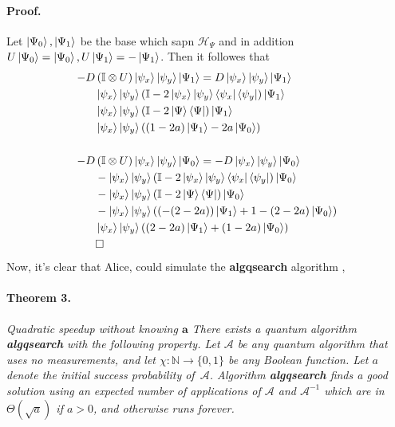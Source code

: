\documentclass{article}
\begin{document}
\begin{multicols*}{2}
\paragraph{Proof.} Let $\ket{\Psi_0}, \ket{\Psi_1}$ be the base which sapn $ \mathcal{H}_{\Psi}$ and in addition $U\ket{\Psi_0} = \ket{\Psi_0}, U\ket{\Psi_1} =- \ket{\Psi_1}$.
    Then it followes that   
    \begin{equation*}
      \begin{split}
    - D & \left( \mathbb{I} \otimes U \right)  \ket{\psi_{x}}\ket{\psi_{y}} \ket{\Psi_1} =    D  \ket{\psi_{x}}\ket{\psi_{y}} \ket{\Psi_1} \\
  &  \ket{\psi_{x}}\ket{\psi_{y}} \left( \mathbb{I} - 2 \ket{\psi_{x}}\ket{\psi_{y}} \bra{ \psi_{x}}\bra{\psi_{y}} \right) \ket{\Psi_1} \\
  &  \ket{\psi_{x}}\ket{\psi_{y}} \left( \mathbb{I} - 2 \ket{\Psi} \bra{\Psi} \right) \ket{\Psi_1}  \\ 
  &  \ket{\psi_{x}}\ket{\psi_{y}} \left( \left( 1 - 2a  \right)\ket{\Psi_1} - 2a \ket{\Psi_0} \right) \\ 
  & \\ 
  - D & \left( \mathbb{I} \otimes U \right)  \ket{\psi_{x}}\ket{\psi_{y}} \ket{\Psi_0} =   - D  \ket{\psi_{x}}\ket{\psi_{y}} \ket{\Psi_0} \\
  &  - \ket{\psi_{x}}\ket{\psi_{y}} \left( \mathbb{I} - 2 \ket{\psi_{x}}\ket{\psi_{y}} \bra{ \psi_{x}}\bra{\psi_{y}} \right) \ket{\Psi_0} \\
  &  - \ket{\psi_{x}}\ket{\psi_{y}} \left( \mathbb{I} - 2 \ket{\Psi} \bra{\Psi} \right) \ket{\Psi_0} \\ 
  &  - \ket{\psi_{x}}\ket{\psi_{y}} \left( \left(  - (2-2a)  \right)\ket{\Psi_1} + 1 -(2 - 2a) \ket{\Psi_0} \right) \\ 
  & \ket{\psi_{x}}\ket{\psi_{y}} \left( \left( 2-2a \right)\ket{\Psi_1} + \left(1  - 2a\right) \ket{\Psi_0} \right) \\ 
  & \square
\end{split}
\end{equation*}
Now, it's clear that Alice, could simulate the \textbf{algqsearch} algorithm \cite{Brassard_2002}, 

\paragraph{Theorem 3.} \textit{Quadratic speedup without knowing $\mathbf{a}$
There exists a quantum algorithm \textbf{algqsearch} with the following property.
Let $\mathcal A$ be any quantum algorithm that uses no measurements,
and let $\chi : \mathbb{N}  \rightarrow \{0,1\}$ be any Boolean function.
Let $a$ denote the initial success probability of~$\mathcal A$.
Algorithm \textbf{algqsearch} finds a good solution using an expected number
of applications of $\mathcal A$ and ${\mathcal A}^{-1}$ which are in
$\Theta(\sqrt a)$ if $a>0$, and otherwise runs forever.}


\end{multicols*}
\end{document}
